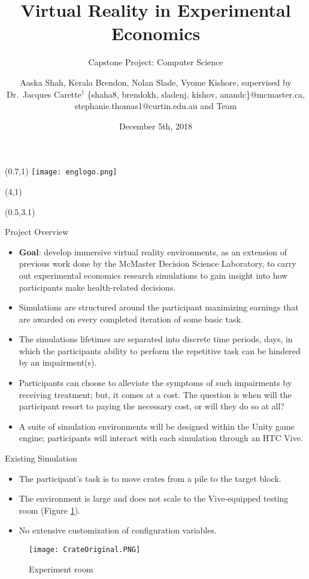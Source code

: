 \documentclass[22pt]{beamer}
\title{Virtual Reality in Experimental Economics}
\subtitle{Capstone Project: Computer Science}
\author[Shah, Brendon, Slade, Kishore \& Carette]{Aaska Shah, Kerala Brendon, Nolan Slade, Vyome Kishore, supervised by Dr.~Jacques Carette$^\dagger$ \vspace{0.3cm} \newline \small \{shaha8, brendokh, sladenj, kishov, anandc\}@mcmaster.ca, stephanie.thomas1@curtin.edu.au and Team}
\institute[McMaster University]{$^\dagger$Department of Computing and Software, McMaster University

1280 Main St. W, Hamilton, Ontario, Canada L8S 4L8}
\date{December 5th, 2018}
\begin{document}

\begin{frame}[fragile]

\begin{textblock}{2}(0.7,1)
\texttt{[image: englogo.png]} %
\end{textblock}

\begin{textblock}{8}(4,1)
\titlepage
\end{textblock}

\begin{textblock}{7.25}(0.5,3.1)

\begin{block}{Project Overview}\newline
\begin{itemize}
\item \textbf{Goal}: develop immersive virtual reality environments, as an extension of previous work done by the McMaster Decision Science Laboratory, to carry out experimental economics research simulations to gain insight into how participants make health-related decisions. 
\item Simulations are structured around the participant maximizing earnings that are awarded on every completed iteration of some basic task.
\item The simulations\textsc{} lifetimes are separated into discrete time periods, days, in which the participant\textsc{}s
ability to perform the repetitive task can be hindered by an impairment(s).
\item Participants can choose to alleviate the symptoms of such impairments by receiving treatment; but, it comes at a cost. The question is when will the participant resort to paying the necessary cost, or will they do so at all? 
\item A suite of simulation environments will be designed within the Unity game engine; participants will interact with each simulation through an HTC Vive. 
\end{itemize}
\end{block}

\begin{block}{Existing Simulation}\newline
\begin{itemize}
\item The participant's task is to move crates from a pile to the target block.
\item The environment is large and does not scale to the Vive-equipped testing room (Figure \ref{fig:crate}).
\item No extensive customization of configuration variables.
\end{itemize}
\newline
\begin{figure}
  \texttt{[image: CrateOriginal.PNG]}
  \caption{Experiment room}
\label{fig:crate}
\end{figure}
\end{block}



\end{textblock}
\end{frame}
\end{document}

